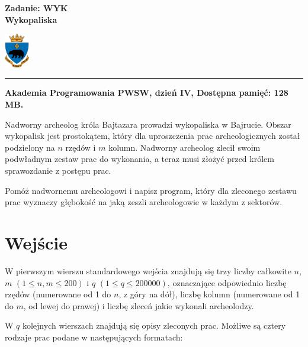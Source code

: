 \documentclass[10pt]{article}
\begin{document}
    

    \noindent
    \begin{minipage}{0.5\textwidth}
        \LARGE{\textsf{\textbf{Zadanie: WYK\\Wykopaliska}}}
    \end{minipage}
    \begin{minipage}{0.5\textwidth}
        \begin{flushright}
            \includegraphics[height=1.5cm]{logo.jpg}
        \end{flushright}
    \end{minipage}
    
    \noindent\rule{\textwidth}{0.4pt}
    
    \noindent\textbf{Akademia Programowania PWSW, dzień IV, Dostępna pamięć: 128 MB.}
    \vspace{1em}
    
    
    \noindent
    Nadworny archeolog króla Bajtazara prowadzi wykopaliska w Bajrucie. Obszar wykopalisk jest prostokątem, który dla uproszczenia prac archeologicznych został podzielony na $n$ rzędów i $m$ kolumn. Nadworny archeolog zlecił swoim podwładnym zestaw prac do wykonania, a teraz musi złożyć przed królem sprawozdanie z postępu prac.
    
    Pomóż nadwornemu archeologowi i napisz program, który dla zleconego zestawu prac wyznaczy głębokość na jaką zeszli archeologowie w każdym z sektorów.


    \section*{Wejście}
    
    W pierwszym wierszu standardowego wejścia znajdują się trzy liczby całkowite $n$, $m$ $(1\leq n, m\leq 200)$ i $q$ $(1\leq q\leq 200000)$, oznaczające odpowiednio liczbę rzędów (numerowane od 1 do $n$, z góry na dół), liczbę kolumn (numerowane od 1 do $m$, od lewej do prawej) i liczbę zleceń jakie wykonali archeolodzy.

    W $q$ kolejnych wierszach znajdują się opisy zleconych prac. Możliwe są cztery rodzaje prac podane w następujących formatach:
\end{document}
